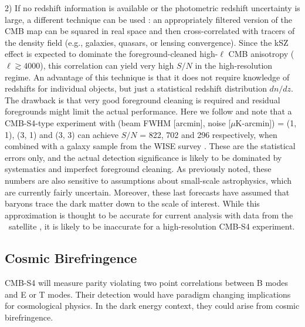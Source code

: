 2) If no redshift information is available or the photometric redshift uncertainty is large, a different technique can be used \cite{Dore:2003ex,Ferraro:2016ymw,Hill:2016dta}:  an appropriately filtered version of the CMB map can be squared in real space and then cross-correlated with tracers of the density field (e.g., galaxies, quasars, or lensing convergence).  Since the kSZ effect is expected to dominate the foreground-cleaned high-$\ell$ CMB anisotropy ($\ell \gtrsim 4000$), this correlation can yield very high $S/N$ in the high-resolution regime.  An advantage of this technique is that it does not require knowledge of redshifts for individual objects, but just a statistical redshift distribution $dn/dz$. The drawback is that very good foreground cleaning is required and residual foregrounds might limit the actual performance.  Here we follow \cite{Ferraro:2016ymw} and note that a CMB-S4-type experiment with (beam FWHM [arcmin], noise [$\mu$K-arcmin]) = (1, 1), (3, 1) and (3, 3) can achieve $S/N$ = 822, 702 and 296 respectively, when combined with a galaxy sample from the WISE survey \cite{Wright:2010qw}.  These are the statistical errors only, and the actual detection significance is likely to be dominated by systematics and imperfect foreground cleaning.  As previously noted, these numbers are also sensitive to assumptions about small-scale astrophysics, which are currently fairly uncertain. Moreover, these last forecasts have assumed that baryons trace the dark matter down to the scale of interest.  While this approximation is thought to be accurate for current analysis with data from the \planck\ satellite \cite{Hill:2016dta}, it is likely to be inaccurate for a high-resolution CMB-S4 experiment.


\subsection{Cosmic Birefringence}
\label{sec-biref}
CMB-S4 will measure parity violating two point correlations between B modes and  E or T modes.   Their detection would have paradigm changing implications
for cosmological physics.  In the dark energy context, they could arise from cosmic birefringence.

